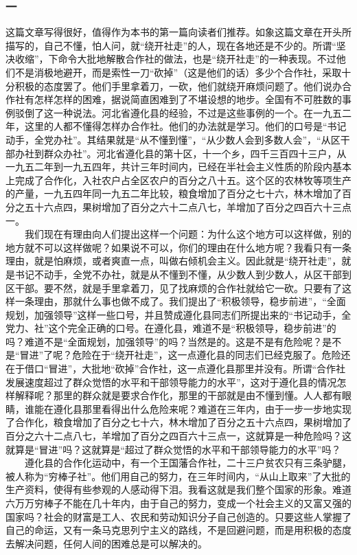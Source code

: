 \documentclass[cn,11pt,chinese]{elegantbook}
\def\myformat#1{\hfil\hfil #1}
\begin{document}
\subsubsection*{\myformat{一}}
这篇文章写得很好，值得作为本书的第一篇向读者们推荐。如象这篇文章在开头所描写的，自己不懂，怕人问，就“绕开社走”的人，现在各地还是不少的。所谓“坚决收缩”，下命令大批地解散合作社的做法，也是“绕开社走”的一种表现。不过他们不是消极地避开，而是索性一刀“砍掉”（这是他们的话）多少个合作社，采取十分积极的态度罢了。他们手里拿着刀，一砍，他们就绕开麻烦问题了。他们说办合作社有怎样怎样的困难，据说简直困难到了不堪设想的地步。全国有不可胜数的事例驳倒了这一种说法。河北省遵化县的经验，不过是这些事例的一个。在一九五二年，这里的人都不懂得怎样办合作社。他们的办法就是学习。他们的口号是“书记动手，全党办社”。其结果就是“从不懂到懂”，“从少数人会到多数人会”，“从区干部办社到群众办社”。河北省遵化县的第十区，十一个乡，四千三百四十三户，从一九五二年到一九五四年，共计三年时间内，已经在半社会主义性质的阶段内基本上完成了合作化，入社农户占全区农户的百分之八十五。这个区的农林牧等项生产的产量，一九五四年同一九五二年比较，粮食增加了百分之七十六，林木增加了百分之五十六点四，果树增加了百分之六十二点八七，羊增加了百分之四百六十三点一。\\
　　我们现在有理由向人们提出这样一个问题：为什么这个地方可以这样做，别的地方就不可以这样做呢？如果说不可以，你们的理由在什么地方呢？我看只有一条理由，就是怕麻烦，或者爽直一点，叫做右倾机会主义。因此就是“绕开社走”，就是书记不动手，全党不办社，就是从不懂到不懂，从少数人到少数人，从区干部到区干部。要不然，就是手里拿着刀，见了找麻烦的合作社就给它一砍。只要有了这样一条理由，那就什么事也做不成了。我们提出了“积极领导，稳步前进”，“全面规划，加强领导”这样一些口号，并且赞成遵化县同志们所提出来的“书记动手，全党力、社”这个完全正确的口号。在遵化县，难道不是“积极领导，稳步前进”的吗？难道不是“全面规划，加强领导”的吗？当然是的。这是不是有危险呢？是不是“冒进”了呢？危险在于“绕开社走”，这一点遵化县的同志们已经克服了。危险还在于借口“冒进”，大批地“砍掉”合作社，这一点遵化县那里并没有。所谓“合作社发展速度超过了群众觉悟的水平和干部领导能力的水平”，这对于遵化县的情况怎样解释呢？那里的群众就是要求合作化，那里的干部就是由不懂到懂。人人都有眼睛，谁能在遵化县那里看得出什么危险来呢？难道在三年内，由于一步一步地实现了合作化，粮食增加了百分之七十六，林木增加了百分之五十六点四，果树增加了百分之六十二点八七，羊增加了百分之四百六十三点一，这就算是一种危险吗？这就算是“冒进”吗？这就算是“超过了群众觉悟的水平和干部领导能力的水平”吗？\\
　　遵化县的合作化运动中，有一个王国藩合作社，二十三户贫农只有三条驴腿，被人称为“穷棒子社”。他们用自己的努力，在三年时间内，“从山上取来”了大批的生产资料，使得有些参观的人感动得下泪。我看这就是我们整个国家的形象。难道六万万穷棒子不能在几十年内，由于自己的努力，变成一个社会主义的又富又强的国家吗？社会的财富是工人、农民和劳动知识分子自己创造的。只要这些人掌握了自己的命运，又有一条马克思列宁主义的路线，不是回避问题，而是用积极的态度去解决问题，任何人间的困难总是可以解决的。\\
\end{document}
